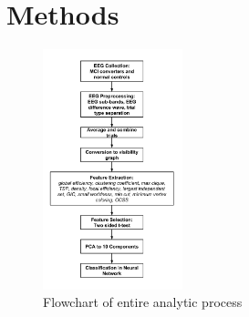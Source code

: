 \documentclass[Afour,times,sageh]{sagej}
\begin{document}








 \section{Methods}

 \begin{figure}
 \centering
\includegraphics[width=0.36\textwidth]{figures/MCI_Olichney_Methods}
\caption{Flowchart of entire analytic process}
\label{Methods}
 \end{figure}
 
\end{document}
